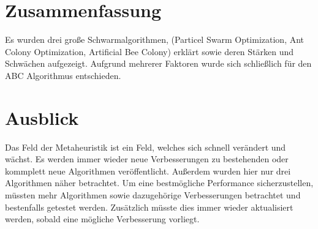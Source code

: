 \section{Zusammenfassung}
Es wurden drei große Schwarmalgorithmen, (Particel Swarm Optimization, Ant Colony Optimization, Artificial Bee Colony) erklärt sowie deren Stärken und Schwächen aufgezeigt. Aufgrund mehrerer Faktoren wurde sich schließlich für den ABC Algorithmus entschieden. 
\section{Ausblick}
Das Feld der Metaheuristik ist ein Feld, welches sich schnell verändert und wächst. Es werden immer wieder neue Verbesserungen zu bestehenden oder kommplett neue Algorithmen veröffentlicht. Außerdem wurden hier nur drei Algorithmen näher betrachtet. Um eine bestmögliche Performance sicherzustellen, müssten mehr Algorithmen sowie dazugehörige Verbesserungen betrachtet und bestenfalls getestet werden. Zusätzlich müsste dies immer wieder aktualisiert werden, sobald eine mögliche Verbesserung vorliegt. 